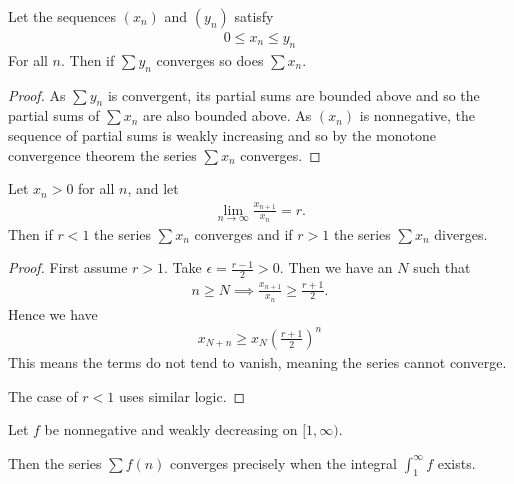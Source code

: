 \documentclass[]{article}
\begin{document}
\begin{thm} 
		Let the sequences $(x_n)$ and $(y_n)$ satisfy
		\begin{align*}
			0 \leq x_n \leq y_n	
		\end{align*}
		For all $n$. Then if $\sum y_n$ converges so does $\sum x_n$.
\end{thm}

\begin{proof}
		As $\sum y_n$ is convergent, its partial sums are bounded above and so the partial sums of $\sum x_n$ are also bounded above. As $(x_n)$ is nonnegative, the sequence of partial sums is weakly increasing and so by the monotone convergence theorem the series $\sum x_n$ converges.
\end{proof}

\begin{thm} 
		Let $x_n > 0$ for all $n$, and let
		\begin{align*}
				\lim_{n\to\infty} \frac{x_{n+1}}{x_n} = r.
		\end{align*}
		Then if $r < 1$ the series $\sum x_n$ converges and if $r > 1$ the series $\sum x_n$ diverges.
\end{thm}

\begin{proof}
		First assume $r > 1$. Take $\epsilon = \frac{r-1}{2} > 0$. Then we have an $N$ such that
		\begin{align*}
				n \geq N \implies \frac{x_{n+1}}{x_n} \geq \frac{r+1}{2}.
		\end{align*}
		Hence we have
		\begin{align*}
				x_{N+n} \geq x_N \left(\frac{r+1}{2}\right)^n
		\end{align*}
		This means the terms do not tend to vanish, meaning the series cannot converge.

		The case of $r < 1$ uses similar logic. 
\end{proof}

\begin{thm} 
		Let $f$ be nonnegative and weakly decreasing on $[1,\infty)$. 

		Then the series $\sum f(n)$ converges precisely when the integral $\int_1^\infty f$ exists.	
\end{thm}
\end{document}

